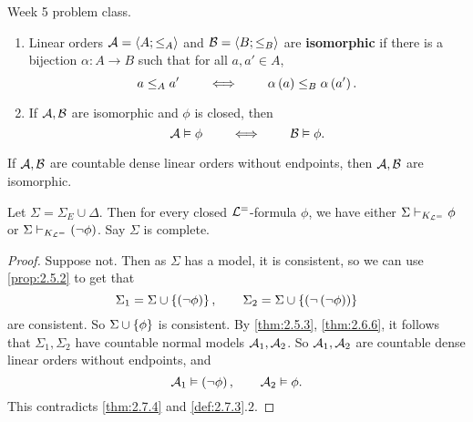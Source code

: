\begin{definition}
\label{def:2.7.3}
Week 5 problem class.
\begin{enumerate}
\item Linear orders $ \AA = \ab{A; \le_A} $ and $ \BB = \ab{B; \le_B} $ are \textbf{isomorphic} if there is a bijection $ \alpha : A \to B $ such that for all $ a, a' \in A $,
$$ a \le_A a' \qquad \iff \qquad \alpha\rb{a} \le_B \alpha\rb{a'}. $$
\item If $ \AA, \BB $ are isomorphic and $ \phi $ is closed, then
$$ \AA \vDash \phi \qquad \iff \qquad \BB \vDash \phi. $$
\end{enumerate}
\end{definition}

\begin{theorem}[Cantor]
\label{thm:2.7.4}
If $ \AA, \BB $ are countable dense linear orders without endpoints, then $ \AA, \BB $ are isomorphic.
\end{theorem}

\begin{lemma}
\label{lem:2.7.5}
Let $ \Sigma = \Sigma_E \cup \Delta $. Then for every closed $ \LL^= $-formula $ \phi $, we have either $ \Sigma \vdash_{K_{\LL^=}} \phi $ or $ \Sigma \vdash_{K_{\LL^=}} \notb{\phi} $. Say $ \Sigma $ is complete.
\end{lemma}

\begin{proof}
Suppose not. Then as $ \Sigma $ has a model, it is consistent, so we can use \ref{prop:2.5.2} to get that
$$ \Sigma_1 = \Sigma \cup \cb{\notb{\phi}}, \qquad \Sigma_2 = \Sigma \cup \cb{\notb{\notb{\phi}}} $$
are consistent. So $ \Sigma \cup \cb{\phi} $ is consistent. By \ref{thm:2.5.3}, \ref{thm:2.6.6}, it follows that $ \Sigma_1, \Sigma_2 $ have countable normal models $ \AA_1, \AA_2 $. So $ \AA_1, \AA_2 $ are countable dense linear orders without endpoints, and
$$ \AA_1 \vDash \notb{\phi}, \qquad \AA_2 \vDash \phi. $$
This contradicts \ref{thm:2.7.4} and \ref{def:2.7.3}.$ 2 $.
\end{proof}

